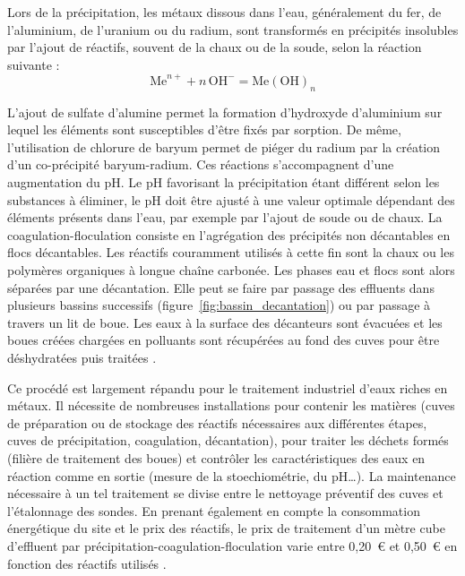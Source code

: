 \documentclass{article}
\begin{document}

Lors de la précipitation, les métaux dissous dans l’eau, généralement du fer, de l'aluminium, de l'uranium ou du radium, sont transformés en précipités insolubles par l’ajout de réactifs, souvent de la chaux ou de la soude, selon la réaction suivante :   
$$\mathrm{Me}^{n+} + n \, \mathrm{OH}^- = \mathrm{Me(OH)}_{n}$$
          	
L’ajout de sulfate d’alumine permet la formation d’hydroxyde d’aluminium sur lequel les éléments sont susceptibles d'être fixés par sorption. De même, l’utilisation de chlorure de baryum permet de piéger du radium par la création d’un co-précipité baryum-radium. Ces réactions s’accompagnent d’une augmentation du pH. Le pH favorisant la précipitation étant différent selon les substances à éliminer, le pH doit être ajusté à une valeur optimale dépendant des éléments présents dans l'eau, par exemple par l’ajout de soude ou de chaux. La coagulation-floculation consiste en l’agrégation des précipités non décantables en flocs  décantables. Les réactifs couramment utilisés à cette fin sont la chaux ou les polymères organiques à longue chaîne carbonée. Les phases eau et flocs sont alors séparées par  une décantation. Elle peut se faire par passage des effluents dans plusieurs bassins successifs (figure~\ref{fig:bassin_decantation}) ou par passage à travers un lit de boue. Les eaux à la surface des décanteurs sont évacuées et les boues créées chargées en polluants sont récupérées au fond des cuves pour être déshydratées puis traitées \cite{colombano_quelles_2010}.

Ce procédé est largement répandu pour le traitement industriel d’eaux riches en métaux. Il nécessite de nombreuses installations pour contenir les matières (cuves de préparation ou de stockage des réactifs nécessaires aux différentes étapes, cuves de précipitation, coagulation, décantation), pour traiter les déchets formés (filière de traitement des boues) et contrôler les caractéristiques des eaux en réaction comme en sortie (mesure de la stoechiométrie, du pH…). La maintenance nécessaire à un tel traitement se divise entre le nettoyage préventif des cuves et l'étalonnage des sondes. En prenant également en compte la consommation énergétique du site et le prix des réactifs, le prix de traitement d’un mètre cube d’effluent par précipitation-coagulation-floculation varie entre 0,20~\euro{} et 0,50~\euro{} en fonction des réactifs utilisés \cite{schick_informations_2020}.
\end{document}
